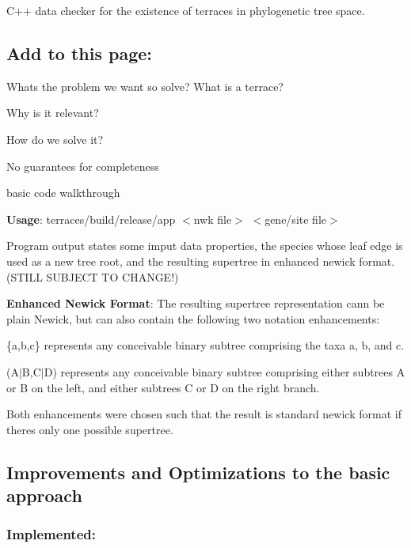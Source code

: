 C++ data checker for the existence of terraces in phylogenetic tree space.

\subsection*{Add to this page\+:}


\begin{DoxyItemize}
\item What\textquotesingle{}s the problem we want so solve? What is a terrace?
\item Why is it relevant?
\item How do we solve it?
\item No guarantees for completeness
\item basic code walkthrough
\end{DoxyItemize}

{\bfseries Usage}\+: {\ttfamily terraces/build/release/app $<$nwk file$>$ $<$gene/site file$>$}

Program output states some imput data properties, the species whose leaf edge is used as a new tree root, and the resulting supertree in enhanced newick format. (S\+T\+I\+LL S\+U\+B\+J\+E\+CT TO C\+H\+A\+N\+G\+E!)

{\bfseries Enhanced Newick Format}\+: The resulting supertree representation cann be plain Newick, but can also contain the following two notation enhancements\+:
\begin{DoxyItemize}
\item {\ttfamily \{a,b,c\}} represents any conceivable binary subtree comprising the taxa a, b, and c.
\item {\ttfamily (A$\vert$B,C$\vert$D)} represents any conceivable binary subtree comprising either subtrees A or B on the left, and either subtrees C or D on the right branch.
\end{DoxyItemize}

Both enhancements were chosen such that the result is standard newick format if there\textquotesingle{}s only one possible supertree.

\subsection*{Improvements and Optimizations to the basic approach}

\subsubsection*{Implemented\+:}


